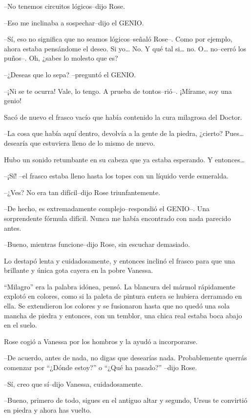 --No tenemos circuitos lógicos--dijo Rose.

--Eso me inclinaba a sospechar--dijo el GENIO.

--Sí, eso no significa que no seamos lógicos--señaló Rose--. Como por
ejemplo, ahora estaba pensándome el deseo. Si yo\ldots{} No. Y qué tal
si\ldots{} no. O\ldots{} no--cerró los puños--. Oh, ¿sabes lo molesto
que es?

--¿Deseas que lo sepa? --preguntó el GENIO.

--¡Ni se te ocurra! Vale, lo tengo. A prueba de tontos--rió--. ¡Mírame,
soy una genio!

Sacó de nuevo el frasco vacío que había contenido la cura milagrosa del
Doctor.

--La cosa que había aquí dentro, devolvía a la gente de la piedra,
¿cierto? Pues\ldots{} desearía que estuviera lleno de lo mismo de nuevo.

Hubo un sonido retumbante en su cabeza que ya estaba esperando. Y
entonces\ldots{}

--¡Sí! --el frasco estaba lleno hasta los topes con un líquido verde
esmeralda.

--¿Ves? No era tan difícil--dijo Rose triunfantemente.

--De hecho, es extremadamente complejo--respondió el GENIO--. Una
sorprendente fórmula difícil. Nunca me había encontrado con nada
parecido antes.

--Bueno, mientras funcione--dijo Rose, sin escuchar demasiado.

Lo destapó lenta y cuidadosamente, y entonces inclinó el frasco para que
una brillante y única gota cayera en la pobre Vanessa.

``Milagro'' era la palabra idónea, pensó. La blancura del mármol
rápidamente explotó en colores, como si la paleta de pintura entera se
hubiera derramado en ella. Se extendieron los colores y se fusionaron
hasta que no quedó una sola mancha de piedra y entonces, con un temblor,
una chica real estaba boca abajo en el suelo.

Rose cogió a Vanessa por los hombros y la ayudó a incorporarse.

--De acuerdo, antes de nada, no digas que desearías nada. Probablemente
querrás comenzar por ``¿Dónde estoy?'' o ``¿Qué ha pasado?'' --dijo
Rose.

--Sí, creo que sí--dijo Vanessa, cuidadosamente.

--Bueno, primero de todo, sigues en el antiguo altar y segundo, Ursus te
convirtió en piedra y ahora has vuelto.

